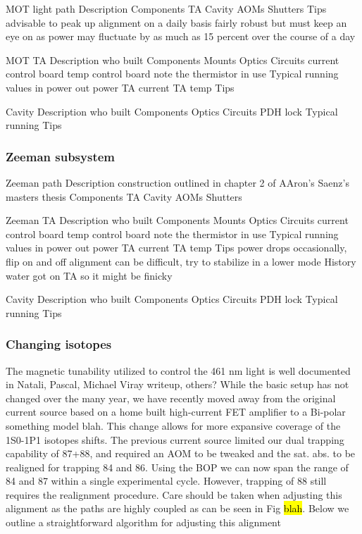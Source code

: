 MOT light path
	Description
	Components
		TA
		Cavity
		AOMs
		Shutters
	Tips
		advisable to peak up alignment on a daily basis 		
		fairly robust but must keep an eye on as power may fluctuate by as much as 15 percent over the course of a day
	
	MOT TA
		Description
			who built
		Components
			Mounts
			Optics
			Circuits
				current control board
				temp control board
					note the thermistor in use
		Typical running values
			in power
			out power
			TA current
			TA temp
		Tips
		
	Cavity
		Description
			who built
		Components
			Optics
			Circuits
				PDH lock
		Typical running
		Tips

\subsubsection{Zeeman subsystem}

Zeeman path
	Description
		construction outlined in chapter 2 of AAron's Saenz's masters thesis
	Components
		TA
		Cavity
		AOMs
		Shutters
	
	Zeeman TA
		Description
			who built
		Components
			Mounts
			Optics
			Circuits
				current control board
				temp control board
					note the thermistor in use
		Typical running values
			in power
			out power
			TA current
			TA temp
		Tips
			power drops occasionally, flip on and off
			alignment can be difficult, try to stabilize in a lower mode
		History
			water got on TA so it might be finicky
		
	Cavity
		Description
			who built
		Components
			Optics
			Circuits
				PDH lock
		Typical running
		Tips
	
	

\subsubsection{Changing isotopes} \label{sssec:change_iso}

The magnetic tunability utilized to control the 461 nm light is well documented in Natali, Pascal, Michael Viray  writeup, others? While the basic setup has not changed over the many year, we have recently moved away from the original current source based on a home built high-current FET amplifier to a Bi-polar something model blah. This change allows for more expansive coverage of the 1S0-1P1 isotopes shifts. The previous current source limited our dual trapping capability of 87+88, and required an AOM to be tweaked and the sat. abs. to be realigned for trapping 84 and 86. Using the BOP we can now span the range of 84 and 87 within a single experimental cycle. However, trapping of 88 still requires the realignment procedure. Care should be taken when adjusting this alignment as the paths are highly coupled as can be seen in Fig \hl{blah}. Below we outline a straightforward algorithm for adjusting this alignment

